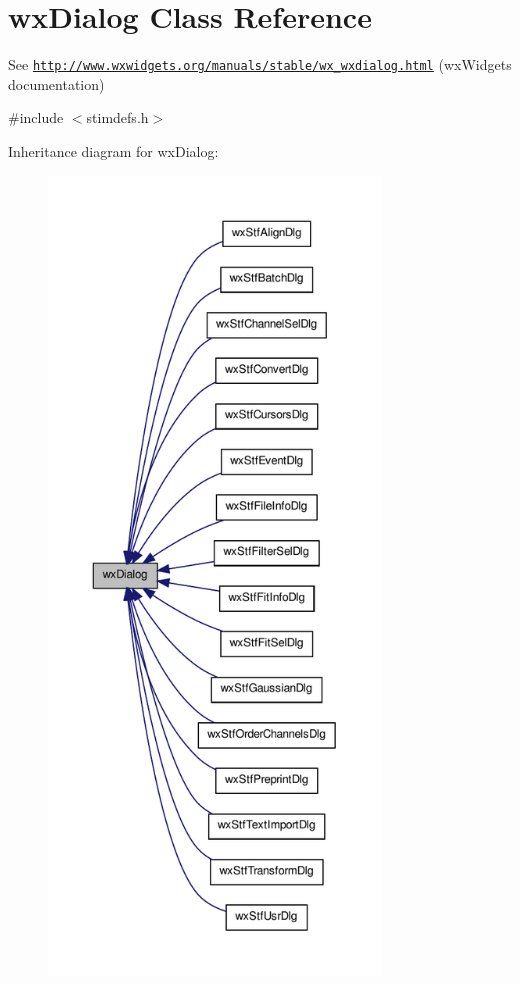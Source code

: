 \hypertarget{classwxDialog}{
\section{wxDialog Class Reference}
\label{classwxDialog}
}


See \href{http://www.wxwidgets.org/manuals/stable/wx_wxdialog.html}{\tt http://www.wxwidgets.org/manuals/stable/wx\_\-wxdialog.html} (wxWidgets documentation)  




{\ttfamily \#include $<$stimdefs.h$>$}



Inheritance diagram for wxDialog:
\nopagebreak
\begin{figure}[H]
\begin{center}
\leavevmode
\includegraphics[height=600pt]{classwxDialog__inherit__graph}
\end{center}
\end{figure}


